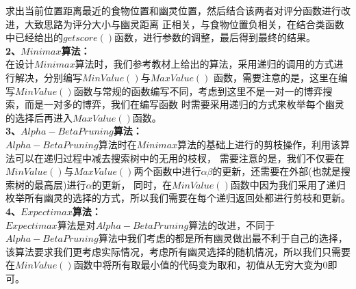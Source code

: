 \documentclass[a4paper,12pt,UTF8]{article}
\begin{document}
\begin{flushleft}
{{        求出当前位置距离最近的食物位置和幽灵位置，然后结合该两者对评分函数进行改进，大致思路为评分大小与幽灵距离
        正相关，与食物位置负相关，在结合类函数中已经给出的$getscore()$函数，进行参数的调整，最后得到最终的结果。\\
    }
    \large{
        \hspace{1cm}\textbf{2、$Minimax$算法：\\}
    }
    \normalsize{
        \hspace{1cm}在设计$Minimax$算法时，我们参考教材上给出的算法，采用递归的调用的方式进行解决，分别编写$MinValue()$与$MaxValue()$
        函数，需要注意的是，这里在编写$MinValue()$函数与常规的函数编写不同，考虑到这里不是一对一的博弈搜索，而是一对多的博弈，我们在编写函数
        时需要采用递归的方式来枚举每个幽灵的选择后再进入$MaxValue()$函数。\\
    }
    \large{
        \hspace{1cm}\textbf{3、$Alpha-Beta Pruning$算法：\\}
    }
    \normalsize{
        \hspace{1cm}$Alpha-Beta Pruning$算法时在$Minimax$算法的基础上进行的剪枝操作，利用该算法可以在递归过程中减去搜索树中的无用的枝杈，
        需要注意的是，我们不仅要在$MinValue()$与$MaxValue()$两个函数中进行$\alpha \beta$的更新，还需要在外部(也就是搜索树的最高层)进行$\alpha$的更新，
        同时，在$MinValue()$函数中因为我们采用了递归枚举所有幽灵的选择的方式，所以我们需要在每个递归返回处都进行剪枝和更新。\\
    }
    \large{
        \hspace{1cm}\textbf{4、$Expectimax$算法：\\}
    }
    \normalsize{
        \hspace{1cm}$Expectimax$算法是对$Alpha-Beta Pruning$算法的改进，不同于$Alpha-Beta Pruning$算法中我们考虑的都是所有幽灵做出最不利于自己的选择，
        该算法要求我们更考虑实际情况，考虑所有幽灵选择的随机情况，所以我们只需要在$MinValue()$函数中将所有取最小值的代码变为取和，初值从无穷大变为0即可。\\

}}
\end{flushleft}
\end{document}

